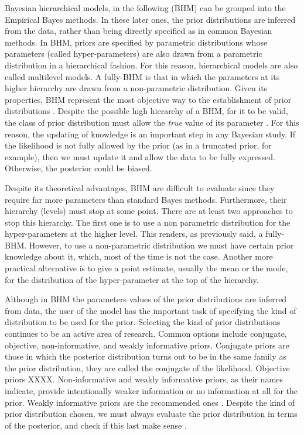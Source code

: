 Bayesian hierarchical models, in the following (BHM) can be grouped into the Empirical Bayes methods. In these later ones, the prior distributions are inferred from the data, rather than being directly specified as in common Bayesian methods. In BHM, priors are specified by parametric distributions whose parameters (called hyper-parameters) are also drawn from a parametric distribution in a hierarchical fashion. For this reason, hierarchical models are also called multilevel models. A fully-BHM is that in which the parameters at its higher hierarchy are drawn from a non-parametric distribution. Given its properties, BHM represent the most objective way to the establishment of prior distributions \citep{Gelman2006}. Despite the possible high hierarchy of a BHM, for it to be valid, the class of prior distribution must allow the \emph{true} value of its parameter \citep{Morris1983}. For this reason, the updating of knowledge is an important step in any Bayesian study. If the likelihood is not fully allowed by the prior (as in a truncated prior, for example), then we must update it and allow the data to be fully expressed. Otherwise, the posterior could be biased.

Despite its theoretical advantages, BHM are difficult to evaluate since they require far more parameters than standard Bayes methods.
Furthermore, their hierarchy (levels) must stop at some point. There are at least two approaches to stop this hierarchy. The first one is to use a non parametric distribution for the hyper-parameters at the higher level. This renders, as previously said, a fully-BHM. However, to use a non-parametric distribution we must have certain prior knowledge about it, which, most of the time is not the case. Another more practical alternative is to give a point estimate, usually the mean or the mode, for the distribution of the hyper-parameter at the top of the hierarchy.  

Although in BHM the parameters values of the prior distributions are inferred from data, the user of the model has the important task of specifying the kind of distribution to be used for the prior. Selecting the kind of prior distributions continues to be an active area of research. Common options include conjugate, objective, non-informative, and weakly informative priors. Conjugate priors are those in which the posterior distribution turns out to be in the same family as the prior distribution, they are called the conjugate of the likelihood. 
Objective priors XXXX. Non-informative and weakly informative priors, as their names indicate, provide intentionally weaker information or no information at all for the prior. Weakly informative priors are the recommended ones \cite[see for example the works of][]{Gelman2006,Huang2013,Chung2015}. Despite the kind of prior distribution chosen, we must always evaluate the prior distribution in terms of the posterior, and check if this last make sense \cite[][ Chap. 6]{Gelman2006,Gelman2013}.
